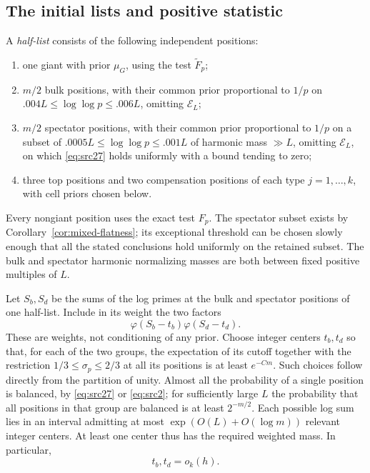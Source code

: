 \subsection{The initial lists and positive statistic}

A \emph{half-list} consists of the following independent positions:
\begin{enumerate}[label=(\roman*)]
 \item one giant with prior $\mu_G$, using the test
       $\widetilde F_p$;
 \item $m/2$ bulk positions, with their common prior proportional to
       $1/p$ on
       $.004L\le\log\log p\le .006L$,
       omitting $\mathcal E_L$;
 \item $m/2$ spectator positions, with their common prior proportional
       to $1/p$ on a subset of
       $.0005L\le\log\log p\le .001L$
       of harmonic mass $\gg L$, omitting $\mathcal E_L$, on which
       \eqref{eq:src27} holds uniformly with a bound tending to zero;
 \item three top positions and two compensation positions of each
       type $j=1,\ldots,k$, with cell priors chosen below.
\end{enumerate}
Every nongiant position uses the exact test $F_p$.  The spectator
subset exists by Corollary~\ref{cor:mixed-flatness}; its exceptional
threshold can be chosen slowly enough that all the stated
conclusions hold uniformly on the retained subset.  The bulk and
spectator harmonic normalizing masses are both between fixed
positive multiples of $L$.

Let $S_b,S_d$ be the sums of the log primes at the bulk and spectator
positions of one half-list.  Include in its weight the two factors
\[
                   \varphi(S_b-t_b)\varphi(S_d-t_d).
\]
These are weights, not conditioning of any prior.  Choose integer
centers $t_b,t_d$ so that, for each of the two groups, the expectation
of its cutoff together with the restriction
$1/3\le\sigma_p\le2/3$ at all its positions is at least $e^{-Cm}$.
Such choices follow directly from the partition of unity.  Almost
all the probability of a single position is balanced, by
\eqref{eq:src27} or \eqref{eq:src2}; for sufficiently large $L$ the
probability that all positions in that group are balanced is at
least $2^{-m/2}$.  Each possible log sum lies in an interval admitting
at most $\exp(O(L)+O(\log m))$ relevant integer centers.  At least
one center thus has the required weighted mass.  In particular,
\[
                    t_b,t_d=o_k(h).
\]

